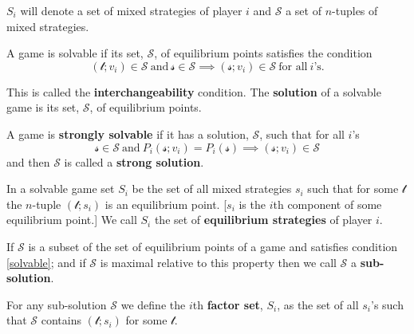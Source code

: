 $S_i $ will denote a set of mixed strategies of player $i$ and $\mathcal{S} $ a set of $n$-tuples of mixed strategies. 

\begin{definition}[Solvability]
    A game is solvable if its set, $\mathcal{S} $, of equilibrium points satisfies the condition 
    \begin{equation}\label{solvable}
        (\mathcal{t} ; v_i ) \in \mathcal{S}  \ \text{and}\ \mathcal{s} \in \mathcal{S}  \implies  (\mathcal{s} ; v_i )\in \mathcal{S} \ \text{for all} \ i\text{'s}.
    \end{equation}
\end{definition}
This is called the \textbf{interchangeability} condition. The \textbf{solution} of a solvable game is its set, $\mathcal{S} $, of equilibrium points.
\begin{definition}
    A game is \textbf{strongly solvable} if it has a solution, $\mathcal{S} $, such that for all $i$'s \[
        \mathcal{s} \in \mathcal{S} \ \text{and} \ P_i (\mathcal{s} ;v_i )=P_i (\mathcal{s} )\implies (\mathcal{s} ;v_i )\in \mathcal{S} 
    \] and then $\mathcal{S} $ is called a \textbf{strong solution}.
\end{definition}
\begin{definition}
    In a solvable game set $S_i $ be the set of all mixed strategies $s_i $ such that for some $\mathcal{t} $ the $n$-tuple $(\mathcal{t} ;s_i )$ is an equilibrium point. [$s_i $ is the $i$th component of some equilibrium point.] We call $S_i $ the set of \textbf{equilibrium strategies} of player $i$.
\end{definition}
\begin{definition}
    If $\mathcal{S} $ is a subset of the set of equilibrium points of a game and satisfies condition \eqref{solvable}; and if $\mathcal{S} $ is maximal relative to this property then we call $\mathcal{S} $ a \textbf{sub-solution}. 

For any sub-solution $\mathcal{S} $ we define the $i$th \textbf{factor set}, $S_i $, as the set of all $s_i $'s such that $\mathcal{S} $ contains $(\mathcal{t} ;s_i )$ for some $\mathcal{t} $.
\end{definition}

